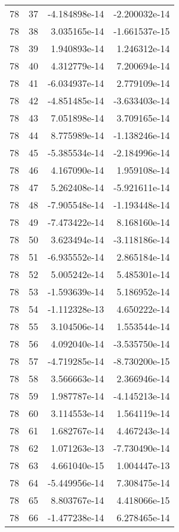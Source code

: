 \begin{tabular}{rrrr}
  78 &   37 & -4.184898e-14 & -2.200032e-14 \\
  78 &   38 &  3.035165e-14 & -1.661537e-15 \\
  78 &   39 &  1.940893e-14 &  1.246312e-14 \\
  78 &   40 &  4.312779e-14 &  7.200694e-14 \\
  78 &   41 & -6.034937e-14 &  2.779109e-14 \\
  78 &   42 & -4.851485e-14 & -3.633403e-14 \\
  78 &   43 &  7.051898e-14 &  3.709165e-14 \\
  78 &   44 &  8.775989e-14 & -1.138246e-14 \\
  78 &   45 & -5.385534e-14 & -2.184996e-14 \\
  78 &   46 &  4.167090e-14 &  1.959108e-14 \\
  78 &   47 &  5.262408e-14 & -5.921611e-14 \\
  78 &   48 & -7.905548e-14 & -1.193448e-14 \\
  78 &   49 & -7.473422e-14 &  8.168160e-14 \\
  78 &   50 &  3.623494e-14 & -3.118186e-14 \\
  78 &   51 & -6.935552e-14 &  2.865184e-14 \\
  78 &   52 &  5.005242e-14 &  5.485301e-14 \\
  78 &   53 & -1.593639e-14 &  5.186952e-14 \\
  78 &   54 & -1.112328e-13 &  4.650222e-14 \\
  78 &   55 &  3.104506e-14 &  1.553544e-14 \\
  78 &   56 &  4.092040e-14 & -3.535750e-14 \\
  78 &   57 & -4.719285e-14 & -8.730200e-15 \\
  78 &   58 &  3.566663e-14 &  2.366946e-14 \\
  78 &   59 &  1.987787e-14 & -4.145213e-14 \\
  78 &   60 &  3.114553e-14 &  1.564119e-14 \\
  78 &   61 &  1.682767e-14 &  4.467243e-14 \\
  78 &   62 &  1.071263e-13 & -7.730490e-14 \\
  78 &   63 &  4.661040e-15 &  1.004447e-13 \\
  78 &   64 & -5.449956e-14 &  7.308475e-14 \\
  78 &   65 &  8.803767e-14 &  4.418066e-15 \\
  78 &   66 & -1.477238e-14 &  6.278465e-14 \\

\end{tabular}
